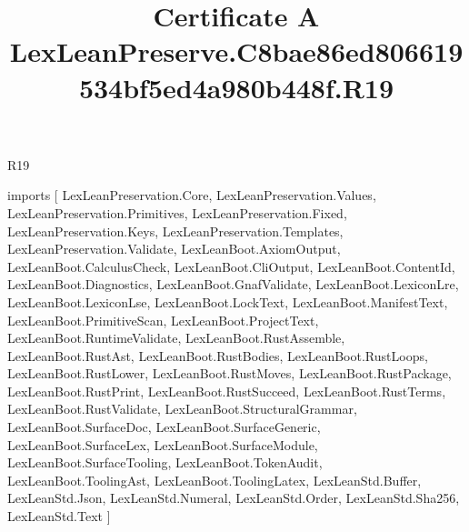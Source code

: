 \begin{lexlean}{R19}
\title{Certificate A LexLeanPreserve.C8bae86ed806619534bf5ed4a980b448f.R19}
\begin{coremodule}
imports [
  LexLeanPreservation.Core,
  LexLeanPreservation.Values,
  LexLeanPreservation.Primitives,
  LexLeanPreservation.Fixed,
  LexLeanPreservation.Keys,
  LexLeanPreservation.Templates,
  LexLeanPreservation.Validate,
  LexLeanBoot.AxiomOutput,
  LexLeanBoot.CalculusCheck,
  LexLeanBoot.CliOutput,
  LexLeanBoot.ContentId,
  LexLeanBoot.Diagnostics,
  LexLeanBoot.GnafValidate,
  LexLeanBoot.LexiconLre,
  LexLeanBoot.LexiconLse,
  LexLeanBoot.LockText,
  LexLeanBoot.ManifestText,
  LexLeanBoot.PrimitiveScan,
  LexLeanBoot.ProjectText,
  LexLeanBoot.RuntimeValidate,
  LexLeanBoot.RustAssemble,
  LexLeanBoot.RustAst,
  LexLeanBoot.RustBodies,
  LexLeanBoot.RustLoops,
  LexLeanBoot.RustLower,
  LexLeanBoot.RustMoves,
  LexLeanBoot.RustPackage,
  LexLeanBoot.RustPrint,
  LexLeanBoot.RustSucceed,
  LexLeanBoot.RustTerms,
  LexLeanBoot.RustValidate,
  LexLeanBoot.StructuralGrammar,
  LexLeanBoot.SurfaceDoc,
  LexLeanBoot.SurfaceGeneric,
  LexLeanBoot.SurfaceLex,
  LexLeanBoot.SurfaceModule,
  LexLeanBoot.SurfaceTooling,
  LexLeanBoot.TokenAudit,
  LexLeanBoot.ToolingAst,
  LexLeanBoot.ToolingLatex,
  LexLeanStd.Buffer,
  LexLeanStd.Json,
  LexLeanStd.Numeral,
  LexLeanStd.Order,
  LexLeanStd.Sha256,
  LexLeanStd.Text
]


\end{coremodule}
\end{lexlean}
